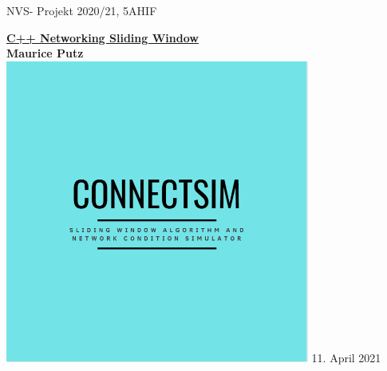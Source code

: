 \documentclass{article}
\begin{document}
\begin{titlepage}
\centering
NVS- Projekt 2020/21, 5AHIF

\vskip2cm
{
	\bfseries\Large
 	\huge\underline{C++ Networking Sliding Window}\\
	Maurice Putz\\
}
\vskip1cm
\includegraphics[width=10cm]{connectsim.png}
\vskip3cm
 11. April 2021\\
\end{titlepage}

\newpage
\tableofcontents
\newpage
{}
\end{document}
